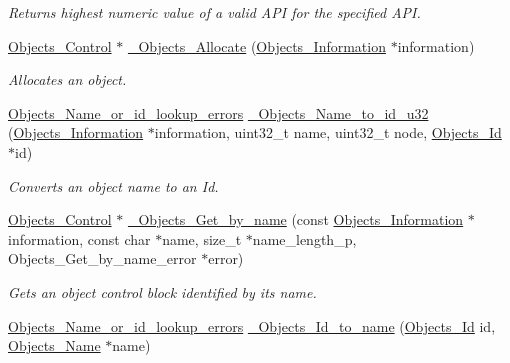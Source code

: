 \begin{DoxyCompactItemize}
\begin{DoxyCompactList}\small\item\em Returns highest numeric value of a valid A\+PI for the specified A\+PI. \end{DoxyCompactList}\item 
\mbox{\hyperlink{structObjects__Control}{Objects\+\_\+\+Control}} $\ast$ \mbox{\hyperlink{group__RTEMSScoreObject_ga3978b5150ea104a85bb28db0585ae000}{\+\_\+\+Objects\+\_\+\+Allocate}} (\mbox{\hyperlink{structObjects__Information}{Objects\+\_\+\+Information}} $\ast$information)
\begin{DoxyCompactList}\small\item\em Allocates an object. \end{DoxyCompactList}\item 
\mbox{\hyperlink{group__RTEMSScoreObject_gaccfeec04954711c389b10aeccc91cabe}{Objects\+\_\+\+Name\+\_\+or\+\_\+id\+\_\+lookup\+\_\+errors}} \mbox{\hyperlink{group__RTEMSScoreObject_ga115dd4137b68639f3dab80aad2f46ced}{\+\_\+\+Objects\+\_\+\+Name\+\_\+to\+\_\+id\+\_\+u32}} (\mbox{\hyperlink{structObjects__Information}{Objects\+\_\+\+Information}} $\ast$information, uint32\+\_\+t name, uint32\+\_\+t node, \mbox{\hyperlink{group__RTEMSScoreObject_ga5821f52a51072941bdd603e542d0863e}{Objects\+\_\+\+Id}} $\ast$id)
\begin{DoxyCompactList}\small\item\em Converts an object name to an Id. \end{DoxyCompactList}\item 
\mbox{\hyperlink{structObjects__Control}{Objects\+\_\+\+Control}} $\ast$ \mbox{\hyperlink{group__RTEMSScoreObject_ga1cb8229e7d5506b14f284af7f7c5f7f7}{\+\_\+\+Objects\+\_\+\+Get\+\_\+by\+\_\+name}} (const \mbox{\hyperlink{structObjects__Information}{Objects\+\_\+\+Information}} $\ast$information, const char $\ast$name, size\+\_\+t $\ast$name\+\_\+length\+\_\+p, Objects\+\_\+\+Get\+\_\+by\+\_\+name\+\_\+error $\ast$error)
\begin{DoxyCompactList}\small\item\em Gets an object control block identified by its name. \end{DoxyCompactList}\item 
\mbox{\hyperlink{group__RTEMSScoreObject_gaccfeec04954711c389b10aeccc91cabe}{Objects\+\_\+\+Name\+\_\+or\+\_\+id\+\_\+lookup\+\_\+errors}} \mbox{\hyperlink{group__RTEMSScoreObject_ga4ef83167e7503b64f503bd9218332cde}{\+\_\+\+Objects\+\_\+\+Id\+\_\+to\+\_\+name}} (\mbox{\hyperlink{group__RTEMSScoreObject_ga5821f52a51072941bdd603e542d0863e}{Objects\+\_\+\+Id}} id, \mbox{\hyperlink{unionObjects__Name}{Objects\+\_\+\+Name}} $\ast$name)

\end{DoxyCompactItemize}

